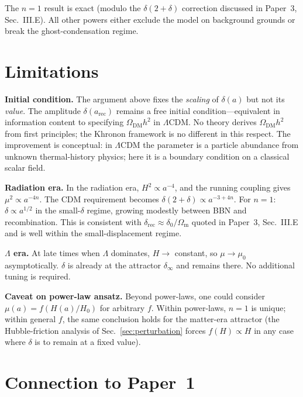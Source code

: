 \documentclass[prd,twocolumn,superscriptaddress,longbibliography,floatfix]{revtex4-2}
\newcommand{\Hzero}{H_{0}}
\newcommand{\muzero}{\mu_{0}}
\newcommand{\OmegaDM}{\Omega_{\mathrm{DM}}}
\newcommand{\Omegam}{\Omega_{\mathrm{m}}}
\begin{document}
The $n = 1$ result is exact (modulo the $\delta(2+\delta)$
correction discussed in Paper~3, Sec.~III.E).  All
other powers either exclude the model on background
grounds or break the ghost-condensation regime.

\section{Limitations}
\label{sec:limitations}

\textbf{Initial condition.}  The argument above fixes
the \emph{scaling} of $\delta(a)$ but not its
\emph{value}.  The amplitude $\delta(a_{\mathrm{rec}})$
remains a free initial condition---equivalent in
information content to specifying $\OmegaDM h^{2}$ in
$\Lambda$CDM.  No theory derives $\OmegaDM h^{2}$ from
first principles; the Khronon framework is no different
in this respect.  The improvement is conceptual: in
$\Lambda$CDM the parameter is a particle abundance from
unknown thermal-history physics; here it is a
boundary condition on a classical scalar field.

\textbf{Radiation era.}  In the radiation era,
$H^{2} \propto a^{-4}$, and the running coupling
gives $\mu^{2} \propto a^{-4n}$.  The CDM requirement
becomes
$\delta(2+\delta) \propto a^{-3+4n}$.  For $n = 1$:
$\delta \propto a^{1/2}$ in the small-$\delta$
regime, growing modestly between BBN and
recombination.  This is consistent with
$\delta_{\mathrm{rec}} \approx \delta_{0}/\Omegam$
quoted in Paper~3, Sec.~III.E and is well within the
small-displacement regime.

\textbf{$\Lambda$ era.}  At late times when
$\Lambda$ dominates, $H \to $ constant, so
$\mu \to \muzero$ asymptotically.  $\delta$ is
already at the attractor $\delta_{\infty}$ and remains
there.  No additional tuning is required.

\textbf{Caveat on power-law ansatz.}  Beyond power-laws,
one could consider $\mu(a) = f(H(a)/\Hzero)$ for
arbitrary $f$.  Within power-laws, $n = 1$ is unique;
within general $f$, the same conclusion holds for the
matter-era attractor (the Hubble-friction analysis of
Sec.~\ref{sec:perturbation} forces
$f(H) \propto H$ in any case where $\delta$ is to
remain at a fixed value).

\section{Connection to Paper~1}
\label{sec:paper1}
\end{document}
